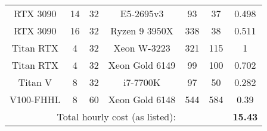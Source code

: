 \begin{table*}[ht!]
\begin{tabular}{@{}ccccccc@{}}
RTX 3090      & 14        & 32     & E5-2695v3                      & 93           & 37          & 0.498         \\
RTX 3090      & 16        & 32     & Ryzen 9 3950X                  & 338          & 38          & 0.511         \\
Titan RTX     & 4         & 32     & Xeon W-3223                   & 321           & 115          & 1             \\
Titan RTX     & 4         & 32     & Xeon Gold 6149                 & 99           & 100         & 0.702         \\ %
Titan V       & 8         & 32     & i7-7700K                       & 97           & 50          & 0.282         \\
V100-FHHL     & 8         & 60     & Xeon Gold 6148                 & 544          & 584         & 0.39          \\
\midrule
\multicolumn{6}{c}{Total hourly cost (as listed):} &\bf 15.43 \\    
\bottomrule
\end{tabular}
\end{table*}

